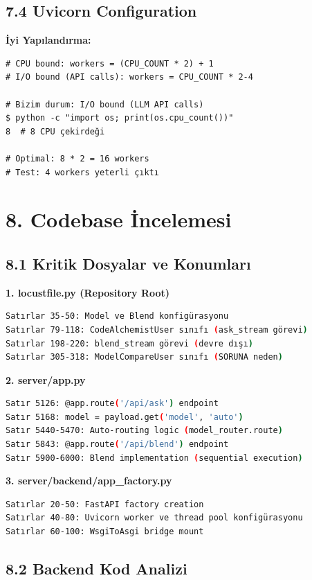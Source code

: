 \documentclass[12pt,a4paper]{report}
\begin{document}
\subsection{7.4 Uvicorn Configuration}

\textbf{İyi Yapılandırma:}
\begin{lstlisting}[bash]
# CPU bound: workers = (CPU_COUNT * 2) + 1
# I/O bound (API calls): workers = CPU_COUNT * 2-4

# Bizim durum: I/O bound (LLM API calls)
$ python -c "import os; print(os.cpu_count())"
8  # 8 CPU çekirdeği

# Optimal: 8 * 2 = 16 workers
# Test: 4 workers yeterli çıktı
\end{lstlisting}

\newpage

\section{8. Codebase İncelemesi}

\subsection{8.1 Kritik Dosyalar ve Konumları}

\textbf{1. locustfile.py (Repository Root)}
\begin{lstlisting}[language=bash]
Satırlar 35-50: Model ve Blend konfigürasyonu
Satırlar 79-118: CodeAlchemistUser sınıfı (ask_stream görevi)
Satırlar 198-220: blend_stream görevi (devre dışı)
Satırlar 305-318: ModelCompareUser sınıfı (SORUNA neden)
\end{lstlisting}

\textbf{2. server/app.py}
\begin{lstlisting}[language=bash]
Satır 5126: @app.route('/api/ask') endpoint
Satır 5168: model = payload.get('model', 'auto')
Satır 5440-5470: Auto-routing logic (model_router.route)
Satır 5843: @app.route('/api/blend') endpoint
Satır 5900-6000: Blend implementation (sequential execution)
\end{lstlisting}

\textbf{3. server/backend/app_factory.py}
\begin{lstlisting}[language=bash]
Satırlar 20-50: FastAPI factory creation
Satırlar 40-80: Uvicorn worker ve thread pool konfigürasyonu
Satırlar 60-100: WsgiToAsgi bridge mount
\end{lstlisting}

\subsection{8.2 Backend Kod Analizi}
\end{document}
